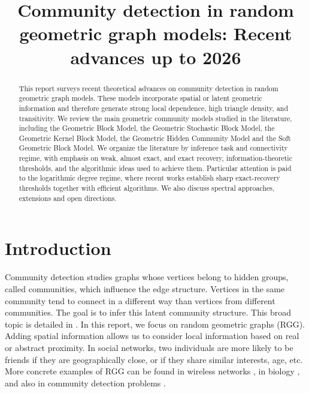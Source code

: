\documentclass[runningheads]{llncs}
\title{Community detection in random geometric graph models: Recent advances up to 2026}
\begin{document}
\maketitle

\begin{abstract}
    This report surveys recent theoretical advances on community detection in random geometric graph models. These models incorporate spatial or latent geometric information and therefore generate strong local dependence, high triangle density, and transitivity. We review the main geometric community models studied in the literature, including the Geometric Block Model, the Geometric Stochastic Block Model, the Geometric Kernel Block Model, the Geometric Hidden Community Model and the Soft Geometric Block Model. We organize the literature by inference task and connectivity regime, with emphasis on weak, almost exact, and exact recovery, information-theoretic thresholds, and the algorithmic ideas used to achieve them. Particular attention is paid to the logarithmic degree regime, where recent works establish sharp exact-recovery thresholds together with efficient algorithms. We also discuss spectral approaches, extensions and open directions.
\end{abstract}

\begingroup
\let\clearpage\relax
\setcounter{tocdepth}{2}
\renewcommand{\contentsname}{}
\makeatletter
\let\l@title\@gobbletwo
\let\l@author\@gobbletwo
\let\authcount\@gobble
\makeatother

\tableofcontents
\endgroup


\section{Introduction}\label{sec:intro}

Community detection studies graphs whose vertices belong to hidden groups, called communities, which influence the edge structure. Vertices in the same community tend to connect in a different way than vertices from different communities. The goal is to infer this latent community structure.
This broad topic is detailed in \citep{fortunato2010community}. In this 
report, we focus on random geometric graphs (RGG). Adding spatial information allows us to consider
local information based on real or abstract proximity.  %
In social networks, two individuals are more likely to be friends if they are geographically close,
or if they share similar interests, age, etc.
More concrete examples of RGG can be found in wireless networks \citep{gomez2015case}, in biology \citep{higham2008fitting},
and also in community detection problems \citep{sankararaman2020comhapdet}.
\end{document}
